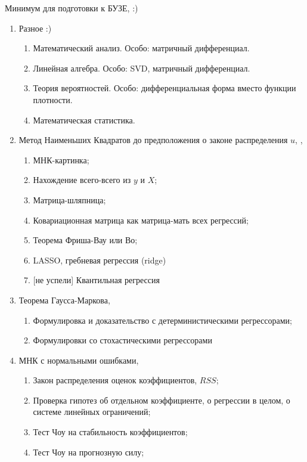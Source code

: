 \documentclass[12pt]{article}
\begin{document}
Минимум для подготовки к БУЗЕ, \cite{creel2018econometrics} :)


\begin{enumerate}

 \item Разное :)
 \begin{enumerate}
   \item Математический анализ. Особо: матричный дифференциал.
   \item Линейная алгебра. Особо: SVD, матричный дифференциал.
   \item Теория вероятностей. Особо: дифференциальная форма вместо функции плотности. 
   \item Математическая статистика.
 \end{enumerate}

 \item Метод Наименьших Квадратов до предположения о законе распределения $u$,
 \cite{schmidheiny2016guides}, \cite{decrouez2018mmdm}

\begin{enumerate}
 \item МНК-картинка;
 \item Нахождение всего-всего из $y$ и $X$;
 \item Матрица-шляпница;
 \item Ковариационная матрица как матрица-мать всех регрессий;
 \item Теорема Фриша-Вау или Во;
 \item LASSO, гребневая регрессия (ridge)
 \item {[не успели]} Квантильная регрессия
\end{enumerate}

 \item Теорема Гаусса-Маркова,  \cite{schmidheiny2016guides}
 \begin{enumerate}
 \item Формулировка и доказательство с детерминистическими регрессорами;
 \item Формулировки со стохастическими регрессорами
 \end{enumerate}

 \item МНК с нормальными ошибками,  \cite{schmidheiny2016guides}

 \begin{enumerate}
 \item Закон распределения оценок коэффициентов, $RSS$;
 \item Проверка гипотез об отдельном коэффициенте, о регрессии в целом, о системе линейных ограничений;
 \item Тест Чоу на стабильность коэффициентов;
 \item Тест Чоу на прогнозную силу;
 \end{enumerate}


\end{enumerate}
\end{document}
